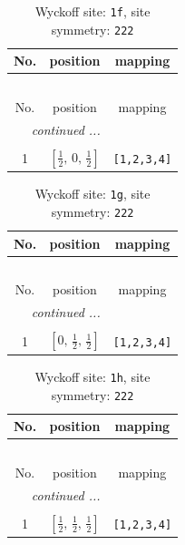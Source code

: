 \documentclass[fleqn,8pt]{jsarticle}
\begin{document}
\renewcommand{\arraystretch}{1.2}
\begin{longtable}{ccc}
\caption{Wyckoff site: {\tt 1f}, site symmetry: {\tt 222}}
 \\
 \hline \hline
No. & position & mapping \\ \hline \endfirsthead

\multicolumn{2}{l}{\tablename\ \thetable{}} \\
 \hline \hline
No. & position & mapping \\ \hline \endhead

 \hline \hline
\multicolumn{2}{r}{\footnotesize\it continued ...} \\ \endfoot

 \hline \hline
\multicolumn{2}{r}{} \\ \endlastfoot

1 & $\left[ \frac{1}{2},\, 0,\, \frac{1}{2} \right]$ & {\tt [1,2,3,4]} \\
\end{longtable}
\renewcommand{\arraystretch}{1.2}
\begin{longtable}{ccc}
\caption{Wyckoff site: {\tt 1g}, site symmetry: {\tt 222}}
 \\
 \hline \hline
No. & position & mapping \\ \hline \endfirsthead

\multicolumn{2}{l}{\tablename\ \thetable{}} \\
 \hline \hline
No. & position & mapping \\ \hline \endhead

 \hline \hline
\multicolumn{2}{r}{\footnotesize\it continued ...} \\ \endfoot

 \hline \hline
\multicolumn{2}{r}{} \\ \endlastfoot

1 & $\left[ 0,\, \frac{1}{2},\, \frac{1}{2} \right]$ & {\tt [1,2,3,4]} \\
\end{longtable}
\renewcommand{\arraystretch}{1.2}
\begin{longtable}{ccc}
\caption{Wyckoff site: {\tt 1h}, site symmetry: {\tt 222}}
 \\
 \hline \hline
No. & position & mapping \\ \hline \endfirsthead

\multicolumn{2}{l}{\tablename\ \thetable{}} \\
 \hline \hline
No. & position & mapping \\ \hline \endhead

 \hline \hline
\multicolumn{2}{r}{\footnotesize\it continued ...} \\ \endfoot

 \hline \hline
\multicolumn{2}{r}{} \\ \endlastfoot

1 & $\left[ \frac{1}{2},\, \frac{1}{2},\, \frac{1}{2} \right]$ & {\tt [1,2,3,4]} \\
\end{longtable}
\end{document}
